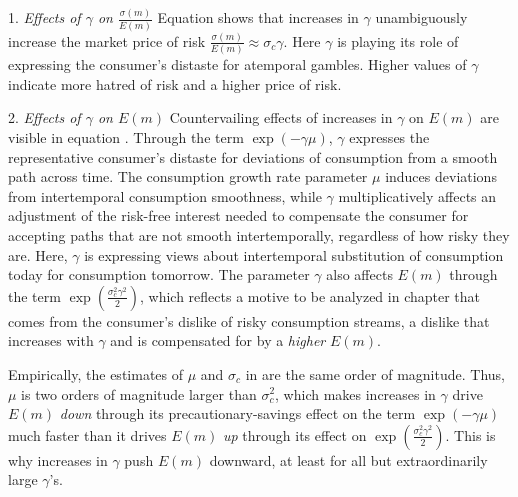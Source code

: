 \medskip
\item{1.} {\it Effects of $\gamma$ on ${\frac{\sigma(m)}{E(m)}}$} \quad Equation  shows that increases in $\gamma$ unambiguously increase the market price of risk ${\frac{\sigma(m)}{E(m)}} \approx \sigma_c \gamma$.
Here $\gamma$ is playing its role of expressing the consumer's distaste for atemporal gambles.  Higher values of $\gamma$ indicate more hatred of risk and a higher price of risk.
 \medskip

\item{2.}  {\it Effects of $\gamma$ on $E(m)$} \quad
 Countervailing effects of increases in $\gamma$ on $E(m)$ are visible in equation .  Through the term  $\exp(- \gamma \mu)$, $\gamma$  expresses
the representative consumer's distaste for deviations of consumption from a smooth path across time.
 The consumption growth rate parameter $\mu$ induces  deviations from intertemporal consumption smoothness,
while $\gamma$ multiplicatively  affects an adjustment of the  risk-free interest needed to compensate the consumer for accepting paths that are not smooth intertemporally, regardless of
how risky they are. Here, $\gamma$ is expressing views about intertemporal substitution of consumption today for consumption tomorrow.
The parameter $\gamma$ also affects $E(m)$ through the term $\exp\left({\frac{\sigma_c^{2}\gamma^2 }{2}}\right)$, which reflects a  motive to be analyzed in chapter  that comes from the consumer's dislike of risky consumption streams, a dislike that increases with $\gamma$ and is  compensated for by a {\it higher} $E(m)$.

 \medskip

 Empirically, the estimates of $\mu$ and $\sigma_c$  in    are the same order of magnitude. Thus, $\mu$ is two orders of magnitude larger than $\sigma_c^2$, which makes increases in $\gamma$ drive $E(m)$ {\it down\/} through its precautionary-savings effect on the term $\exp(- \gamma \mu)$ much faster
than it drives $E(m)$ {\it up\/} through its effect on $\exp\left({\frac{\sigma_c^{2}\gamma^2 }{2}}\right)$. This is why increases in $\gamma$ push $E(m)$ downward, at least for all but extraordinarily  large $\gamma$'s. %


